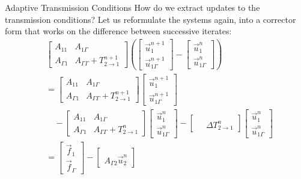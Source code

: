 \documentclass{beamer}
\begin{document}
\begin{frame}{Adaptive Transmission Conditions}
How do we extract updates to the transmission conditions?
Let us reformulate the systems again, into a corrector form that works on the difference between successive iterates:
\begin{align*}
	& \begin{bmatrix} A_{11} & A_{1 \Gamma} \\ A_{\Gamma 1} & A_{\Gamma \Gamma} + T_{2 \to 1}^{n+1} \end{bmatrix}
	\left ( \begin{bmatrix} \vec{u}_1^{n+1} \\ \vec{u}_{1 \Gamma}^{n+1} \end{bmatrix} - \begin{bmatrix} \vec{u}_1^n \\ \vec{u}_{1 \Gamma}^n \end{bmatrix} \right ) \\
	& = \begin{bmatrix} A_{11} & A_{1 \Gamma} \\ A_{\Gamma 1} & A_{\Gamma \Gamma} + T_{2 \to 1}^{n+1} \end{bmatrix}
	\begin{bmatrix} \vec{u}_1^{n+1} \\ \vec{u}_{1 \Gamma}^{n+1} \end{bmatrix} \\
	& \quad - \begin{bmatrix} A_{11} & A_{1 \Gamma} \\ A_{\Gamma 1} & A_{\Gamma \Gamma} + T_{2 \to 1}^n \end{bmatrix}
	\begin{bmatrix} \vec{u}_1^n \\ \vec{u}_{1 \Gamma}^n \end{bmatrix}
	- \begin{bmatrix} ~ & ~ \\ ~ & \Delta T_{2 \to 1}^n \end{bmatrix} \begin{bmatrix} \vec{u}_1^n \\ \vec{u}_{1 \Gamma}^n \end{bmatrix} \\
	& = \begin{bmatrix} \vec{f}_1 \\ \vec{f}_\Gamma \end{bmatrix}
	- \begin{bmatrix} ~ \\ A_{\Gamma 2} \vec{u}_2^n \end{bmatrix}

\end{align*}
\end{frame}
\end{document}
